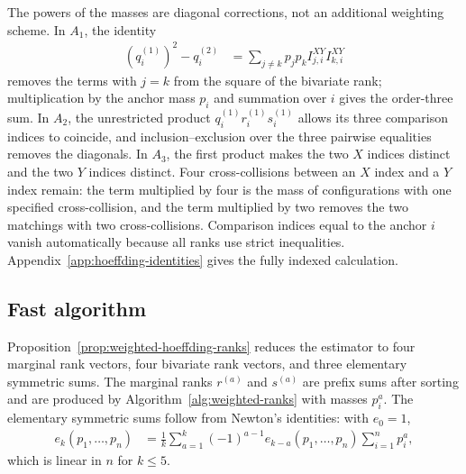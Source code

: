 The powers of the masses are diagonal corrections, not an additional weighting
scheme. In $A_1$, the identity
\begin{align*}
    \left(q_i^{(1)}\right)^2-q_i^{(2)}
    &= \sum_{j\neq k}p_jp_k I_{j,i}^{XY}I_{k,i}^{XY}
\end{align*}
removes the terms with $j=k$ from the square of the bivariate rank;
multiplication by the anchor mass $p_i$ and summation over $i$ gives the
order-three sum. In $A_2$, the unrestricted product
$q_i^{(1)}r_i^{(1)}s_i^{(1)}$ allows its three comparison indices to
coincide, and inclusion--exclusion over the three pairwise equalities removes
the diagonals. In $A_3$, the first product makes the two $X$ indices distinct
and the two $Y$ indices distinct. Four cross-collisions between an $X$ index
and a $Y$ index remain: the term multiplied by four is the mass of
configurations with one specified cross-collision, and the term multiplied by
two removes the two matchings with two cross-collisions. Comparison indices
equal to the anchor $i$ vanish automatically because all ranks use strict
inequalities. Appendix~\ref{app:hoeffding-identities} gives the fully indexed
calculation.

\subsection{Fast algorithm}
\label{subsec:hoeffding-algorithm}

Proposition~\ref{prop:weighted-hoeffding-ranks} reduces the estimator to four
marginal rank vectors, four bivariate rank vectors, and three elementary
symmetric sums. The marginal ranks $r^{(a)}$ and $s^{(a)}$ are prefix sums
after sorting and are produced by Algorithm~\ref{alg:weighted-ranks} with
masses $p_i^a$. The elementary symmetric sums follow from Newton's identities:
with $e_0=1$,
\begin{align*}
    e_k(p_1,\ldots,p_n)
    &= \frac{1}{k}\sum_{a=1}^k(-1)^{a-1}
       e_{k-a}(p_1,\ldots,p_n)\sum_{i=1}^n p_i^a,
\end{align*}
which is linear in $n$ for $k\leq5$.

